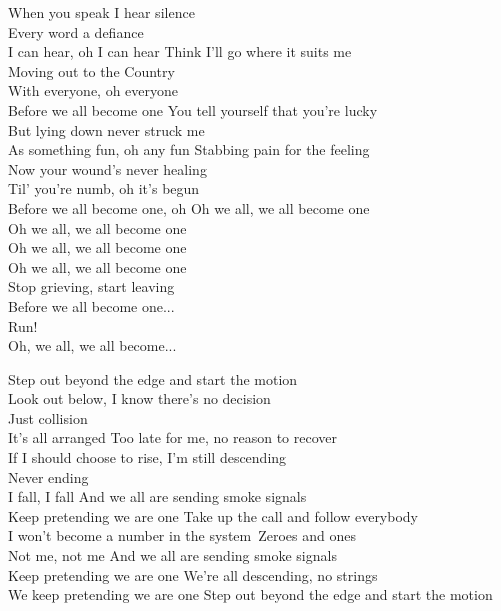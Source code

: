 \begin{flushleft}
\hops
When you speak I hear silence\\
Every word a defiance\\
I can hear, oh I can hear
\hops
Think I'll go where it suits me\\
Moving out to the Country\\
With everyone, oh everyone\\
Before we all become one
\hops
You tell yourself that you're lucky\\
But lying down never struck me\\
As something fun, oh any fun
\hops
Stabbing pain for the feeling\\
Now your wound's never healing\\
Til' you're numb, oh it's begun\\
Before we all become one, oh
\hops
Oh we all, we all become one\\
Oh we all, we all become one\\
Oh we all, we all become one\\
Oh we all, we all become one\\
\hops
Stop grieving, start leaving\\
Before we all become one...\\
Run!\\
Oh, we all, we all become...
\end{flushleft}
\newpage

\begin{flushleft}
Step out beyond the edge and start the motion\\
Look out below, I know there's no decision\\
Just collision\\
It's all arranged
\hops
Too late for me, no reason to recover\\
If I should choose to rise, I'm still descending\\
Never ending\\
I fall, I fall
\hops
And we all are sending smoke signals\\
Keep pretending we are one
\hops
Take up the call and follow everybody\\
I won't become a number in the system\
Zeroes and ones\\
Not me, not me
\hops
And we all are sending smoke signals\\
Keep pretending we are one
\hops
We're all descending, no strings\\
We keep pretending we are one
\hops
Step out beyond the edge and start the motion
\end{flushleft}
\newpage

